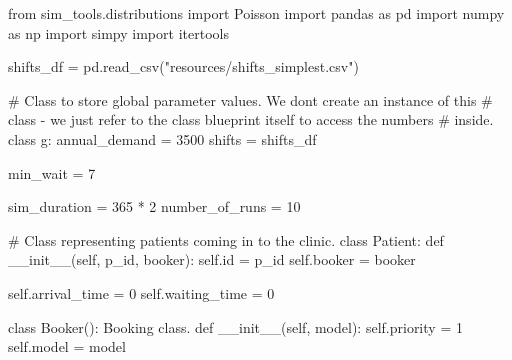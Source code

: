 \documentclass[
  letterpaper,
  DIV=11,
  numbers=noendperiod]{scrreprt}
\newenvironment{Shaded}{}{}
\newcommand{\BuiltInTok}[1]{\textcolor[rgb]{0.84,0.23,0.29}{#1}}
\newcommand{\CommentTok}[1]{\textcolor[rgb]{0.42,0.45,0.49}{#1}}
\newcommand{\DecValTok}[1]{\textcolor[rgb]{0.00,0.36,0.77}{#1}}
\newcommand{\FunctionTok}[1]{\textcolor[rgb]{0.44,0.26,0.76}{#1}}
\newcommand{\ImportTok}[1]{\textcolor[rgb]{0.01,0.18,0.38}{#1}}
\newcommand{\KeywordTok}[1]{\textcolor[rgb]{0.84,0.23,0.29}{#1}}
\newcommand{\NormalTok}[1]{\textcolor[rgb]{0.14,0.16,0.18}{#1}}
\newcommand{\OperatorTok}[1]{\textcolor[rgb]{0.14,0.16,0.18}{#1}}
\newcommand{\StringTok}[1]{\textcolor[rgb]{0.01,0.18,0.38}{#1}}
\newcommand{\VariableTok}[1]{\textcolor[rgb]{0.89,0.38,0.04}{#1}}
\begin{document}
\begin{tcolorbox}[enhanced jigsaw, colframe=quarto-callout-note-color-frame, bottomtitle=1mm, breakable, rightrule=.15mm, coltitle=black, colbacktitle=quarto-callout-note-color!10!white, opacityback=0, leftrule=.75mm, arc=.35mm, toptitle=1mm, title=\textcolor{quarto-callout-note-color}{\faInfo}\hspace{0.5em}{Click here to view the full code}, titlerule=0mm, colback=white, toprule=.15mm, bottomrule=.15mm, left=2mm, opacitybacktitle=0.6]

\label{annotated-cell-327}%
\begin{Shaded}
\begin{Highlighting}[]
\ImportTok{from}\NormalTok{ sim\_tools.distributions }\ImportTok{import}\NormalTok{ Poisson}
\ImportTok{import}\NormalTok{ pandas }\ImportTok{as}\NormalTok{ pd}
\ImportTok{import}\NormalTok{ numpy }\ImportTok{as}\NormalTok{ np}
\ImportTok{import}\NormalTok{ simpy}
\ImportTok{import}\NormalTok{ itertools}

\NormalTok{shifts\_df }\OperatorTok{=}\NormalTok{ pd.read\_csv(}\StringTok{"resources/shifts\_simplest.csv"}\NormalTok{)}

\CommentTok{\# Class to store global parameter values.  We don\textquotesingle{}t create an instance of this}
\CommentTok{\# class {-} we just refer to the class blueprint itself to access the numbers}
\CommentTok{\# inside.}
\KeywordTok{class}\NormalTok{ g:}
\NormalTok{    annual\_demand }\OperatorTok{=} \DecValTok{3500}
\NormalTok{    shifts }\OperatorTok{=}\NormalTok{ shifts\_df}

\NormalTok{    min\_wait }\OperatorTok{=} \DecValTok{7}

\NormalTok{    sim\_duration }\OperatorTok{=} \DecValTok{365} \OperatorTok{*} \DecValTok{2}
\NormalTok{    number\_of\_runs }\OperatorTok{=} \DecValTok{10}

\CommentTok{\# Class representing patients coming in to the clinic.}
\KeywordTok{class}\NormalTok{ Patient:}
    \KeywordTok{def} \FunctionTok{\_\_init\_\_}\NormalTok{(}\VariableTok{self}\NormalTok{, p\_id, booker):}
        \VariableTok{self}\NormalTok{.}\BuiltInTok{id} \OperatorTok{=}\NormalTok{ p\_id}
        \VariableTok{self}\NormalTok{.booker }\OperatorTok{=}\NormalTok{ booker}

        \VariableTok{self}\NormalTok{.arrival\_time }\OperatorTok{=} \DecValTok{0}
        \VariableTok{self}\NormalTok{.waiting\_time }\OperatorTok{=} \DecValTok{0}

\KeywordTok{class}\NormalTok{ Booker():}
    \CommentTok{\textquotesingle{}\textquotesingle{}\textquotesingle{}}
\CommentTok{    Booking class.}
\CommentTok{    \textquotesingle{}\textquotesingle{}\textquotesingle{}}
    \KeywordTok{def} \FunctionTok{\_\_init\_\_}\NormalTok{(}\VariableTok{self}\NormalTok{, model):}
        \VariableTok{self}\NormalTok{.priority }\OperatorTok{=} \DecValTok{1}
        \VariableTok{self}\NormalTok{.model }\OperatorTok{=}\NormalTok{ model}


\end{Highlighting}
\end{Shaded}
\end{tcolorbox}
\end{document}
